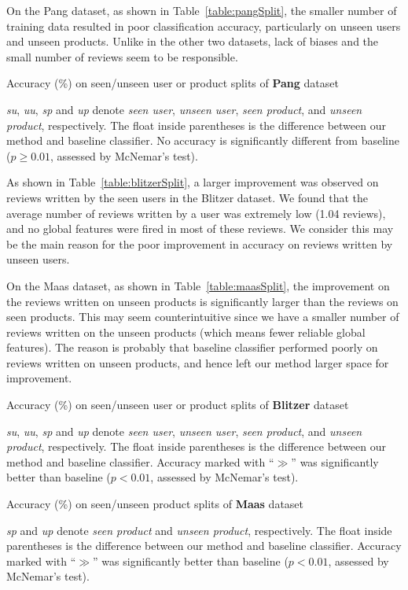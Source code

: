 \documentclass[english]{jnlp_1.4}
\begin{document}
On the Pang dataset, as shown in Table~\ref{table:pangSplit}, the smaller number of training data resulted in poor classification accuracy, particularly on unseen users and unseen products.
Unlike in the other two datasets, lack of biases and the small number of reviews seem to be responsible.

\begin{table}[b]
\caption{Accuracy (\%) on seen/unseen user or product splits of {\bf Pang} dataset}
\label{table:pangSplit}

\small
\textit{su}, \textit{uu}, \textit{sp} and \textit{up} denote \textit{seen user}, \textit{unseen user}, \textit{seen product}, and \textit{unseen product}, respectively. The float inside parentheses is the difference between our method and baseline classifier. No accuracy is significantly different from baseline ($p \geq 0.01$, assessed by McNemar's test).
\par
\end{table}

As shown in Table~\ref{table:blitzerSplit}, a larger improvement was observed on reviews written by the seen users in the Blitzer dataset. 
We found that the average number of reviews written by a user was extremely low (1.04 reviews), and no global features were fired in most of these reviews.
We consider this may be the main reason for the poor improvement in accuracy on reviews written by unseen users.

On the Maas dataset, as shown in Table~\ref{table:maasSplit}, the improvement on the reviews written on unseen products is significantly larger than the reviews on seen products.
This may seem counterintuitive since we have a smaller number of reviews written on the unseen products (which means fewer reliable global features). 
The reason is probably that baseline classifier performed poorly on reviews written on unseen products, and hence left our method larger space for improvement.

\begin{table}[t]
\caption{ Accuracy (\%) on seen/unseen user or product splits of {\bf Blitzer} dataset}
\label{table:blitzerSplit}

\small\textit{su}, \textit{uu}, \textit{sp} and \textit{up} denote \textit{seen user}, \textit{unseen user}, \textit{seen product}, and \textit{unseen product}, respectively. The float inside parentheses is the difference between our method and baseline classifier. Accuracy marked with ``$\gg$''  was significantly better than baseline ($p < 0.01$, assessed by McNemar's test).
\par
\end{table}
\begin{table}[t]
\caption{Accuracy (\%) on seen/unseen product splits of {\bf Maas} dataset}
\label{table:maasSplit}

\vspace{4pt}
\small
\textit{sp} and \textit{up} denote \textit{seen product} and \textit{unseen product}, respectively. The float inside parentheses is the difference between our method and baseline classifier. Accuracy marked with ``$\gg$''  was significantly better than baseline ($p < 0.01$, assessed by McNemar's test).
\par
\end{table}
\end{document}
